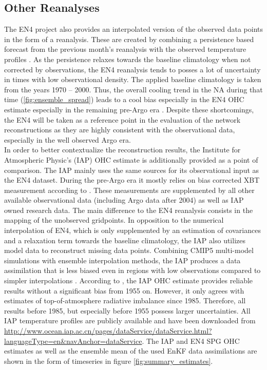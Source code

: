 \documentclass[Masterarbeit.tex]{subfile}
\begin{document}
	\subsection{Other Reanalyses}
	
	The EN4 project also provides an interpolated version of the observed data points in the form of a reanalysis. These are created by combining a persistence based forecast from the previous month's reanalysis with the observed temperature profiles \cite{good_en4_2013}. As the persistence relaxes towards the baseline climatology when not corrected by observations, the EN4 reanalysis tends to posses a lot of uncertainty in times with low observational density. The applied baseline climatology is taken from the years 1970 -- 2000. Thus, the overall cooling trend in the NA during that time (\ref{fig:ensemble_spread}) leads to a cool bias especially in the EN4 OHC estimate especially in the remaining pre-Argo era \cite{good_en4_2013}. Despite these shortcomings, the EN4 will be taken as a reference point in the evaluation of the network reconstructions as they are highly consistent with the observational data, especially in the well observed Argo era. \\
	In order to better contextualize the reconstruction results, the Institute for Atmospheric Physic's (IAP) OHC estimate is additionally provided as a point of comparison. The IAP mainly uses the same sources for its observational input as the EN4 dataset. During the pre-Argo era it mostly relies on bias corrected XBT measurement according to \cite{cheng_time_2014}. These measurements are supplemented by all other available observational data (including Argo data after 2004) as well as IAP owned research data. The main difference to the EN4 reanalysis consists in the mapping of the unobserved gridpoints. In opposition to the numerical interpolation of EN4, which is only supplemented by an estimation of covariances and a relaxation term towards the baseline climatology, the IAP also utilizes model data to reconstruct missing data points. Combining CMIP5 multi-model simulations with ensemble interpolation methods, the IAP produces a data assimilation that is less biased even in regions with low observations compared to simpler interpolations \cite{cheng_iap_2016}. According to \cite{cheng_iap_2016}, the IAP OHC estimate provides reliable results without a significant bias from 1955 on. However, it only agrees with estimates of top-of-atmosphere radiative imbalance since 1985. Therefore, all results before 1985, but especially before 1955 possess larger uncertainties. All IAP temperature profiles are publicly available and have been downloaded from \url{http://www.ocean.iap.ac.cn/pages/dataService/dataService.html?languageType=en&navAnchor=dataService}. The IAP and EN4 SPG OHC estimates as well as the ensemble mean of the used EnKF data assimilations are shown in the form of timeseries in figure \ref{fig:summary_estimates}. \\
	
\end{document}

